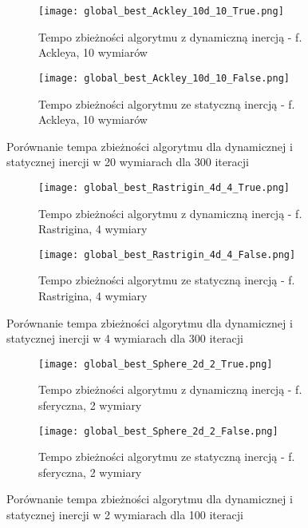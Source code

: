 \documentclass[12pt]{article}
\begin{document}
\begin{figure}[ht]
	\centering
	\begin{subfigure}{0.49\textwidth}
		\texttt{[image: global\_best\_Ackley\_10d\_10\_True.png]}
		\caption{Tempo zbieżności algorytmu z dynamiczną inercją - f. Ackleya, 10 wymiarów}
	\end{subfigure}
	\hfill
	\begin{subfigure}{0.49\textwidth}
		\texttt{[image: global\_best\_Ackley\_10d\_10\_False.png]}
		\caption{Tempo zbieżności algorytmu ze statyczną inercją - f. Ackleya, 10 wymiarów}
	\end{subfigure}
	\caption{Porównanie tempa zbieżności algorytmu dla dynamicznej i statycznej inercji w 20 wymiarach dla 300 iteracji}
	\label{20d_comp}
\end{figure}


\begin{figure}[ht]
	\centering
	\begin{subfigure}{0.49\textwidth}
		\texttt{[image: global\_best\_Rastrigin\_4d\_4\_True.png]}
		\caption{Tempo zbieżności algorytmu z dynamiczną inercją - f. Rastrigina, 4 wymiary}
	\end{subfigure}
	\hfill
	\begin{subfigure}{0.49\textwidth}
		\texttt{[image: global\_best\_Rastrigin\_4d\_4\_False.png]}
		\caption{Tempo zbieżności algorytmu ze statyczną inercją - f. Rastrigina, 4 wymiary}
	\end{subfigure}
	\caption{Porównanie tempa zbieżności algorytmu dla dynamicznej i statycznej inercji w 4 wymiarach dla 300 iteracji}
	\label{4d_comp}
\end{figure}

\begin{figure}[ht]
	\centering
	\begin{subfigure}{0.49\textwidth}
		\texttt{[image: global\_best\_Sphere\_2d\_2\_True.png]}
		\caption{Tempo zbieżności algorytmu z dynamiczną inercją - f. sferyczna, 2 wymiary}
	\end{subfigure}
	\hfill
	\begin{subfigure}{0.49\textwidth}
		\texttt{[image: global\_best\_Sphere\_2d\_2\_False.png]}
		\caption{Tempo zbieżności algorytmu ze statyczną inercją - f. sferyczna, 2 wymiary}
	\end{subfigure}
	\caption{Porównanie tempa zbieżności algorytmu dla dynamicznej i statycznej inercji w 2 wymiarach dla 100 iteracji}
	\label{2d_comp}
\end{figure}
\end{document}

